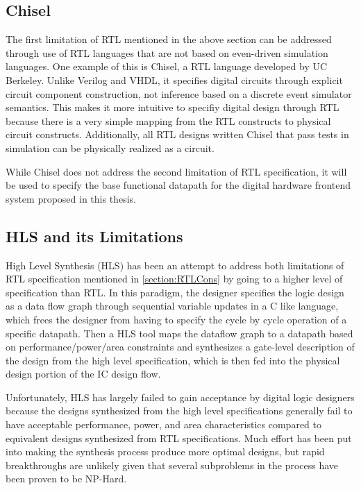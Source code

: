 \subsection{Chisel}
The first limitation of RTL mentioned in the above section can be addressed through use of RTL languages that are not based on even-driven simulation languages. One example of this is Chisel\cite{Bachrach:2012}, a RTL language developed by UC Berkeley. Unlike Verilog and VHDL, it specifies digital circuits through explicit circuit component construction, not inference based on a discrete event simulator semantics. This makes it more intuitive to specifiy digital design through RTL because there is a very simple mapping from the RTL constructs to physical circuit constructs. Additionally, all RTL designs written Chisel that pass tests in simulation can be physically realized as a circuit.

While Chisel does not address the second limitation of RTL specification, it will be used to specify the base functional datapath for the digital hardware frontend system proposed in this thesis.

\subsection{HLS and its Limitations}
High Level Synthesis (HLS) has been an attempt to address both limitations of RTL specification mentioned in \ref{section:RTLCons} by going to a higher level of specification than RTL. In this paradigm, the designer specifies the logic design as a data flow graph through sequential variable updates in a C like language, which frees the designer from having to specify the cycle by cycle operation of a specific datapath. Then a HLS tool maps the dataflow graph to a datapath based on performance/power/area constraints and synthesizes a gate-level description of the design from the high level specification, which is then fed into the physical design portion of the IC design flow. 

Unfortunately, HLS has largely failed to gain acceptance by digital logic designers because the designs synthesized from the high level specifications generally fail to have acceptable performance, power, and area characteristics compared to equivalent designs synthesized from RTL specifications. Much effort has been put into making the synthesis process produce more optimal designs, but rapid breakthroughs are unlikely given that several subproblems in the process have been proven to be NP-Hard\cite{McFarlan:1990}.


